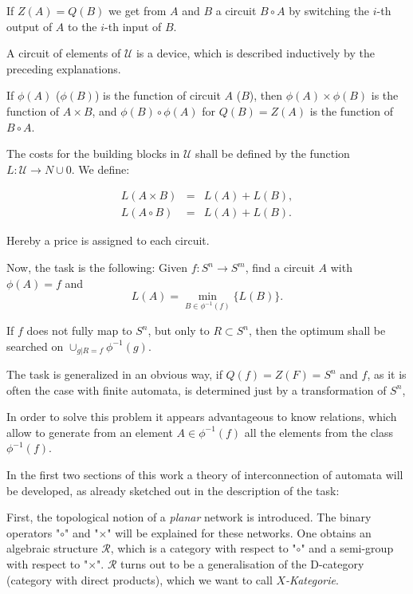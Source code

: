 \documentclass{article}
\begin{document}
If $Z(A) = Q(B)$ we get from $A$ and $B$ a circuit $B\circ A$ by switching the $i$-th output of $A$ to the $i$-th input of $B$.

A circuit of elements of $\mathcal{U}$ is a device, which is described inductively by the preceding explanations.

If $\phi(A)$ ($\phi(B)$) is the function of circuit $A$ ($B$), then $\phi(A)\times \phi(B)$ is the function of $A\times B$, and $\phi(B)\circ \phi(A)$ for $Q(B) = Z(A)$  is the function of $B\circ A$.

The costs for the building blocks in $\mathcal{U}$ shall be defined by the function $L : \mathcal{U} \rightarrow N \cup {0}$. We define:

\[
\begin{array}{lcr}
L(A\times B) & = & L(A) + L(B), \\
L(A\circ B) & = & L(A) + L(B).
\end{array}
\]

Hereby a price is assigned to each circuit.

Now, the task is the following: Given $f : S^n \rightarrow S^m$, find a circuit $A$ with $\phi(A) = f$ and
\[
L(A) = \min_{B \in \phi^{-1}(f)} \{ L(B) \}.
\]

If $f$ does not fully map to $S^n$, but only to $R \subset S^n$, then the optimum shall be searched on $\cup_{g|R=f} \phi^{-1}(g)$. 

The task is generalized in an obvious way, if $Q(f) = Z(F) = S^n$ and $f$, as it is often the case with finite automata, is determined just by a transformation of $S^n$, 

In order to solve this problem it appears advantageous to know relations, which allow to generate from an element $A \in \phi^{-1}(f)$ all the elements from the class $\phi^{-1}(f)$.

In the first two sections of this work a theory of interconnection of automata will be developed, as already sketched out in the description of the task:

First, the topological notion of a \emph{planar} network is introduced. The binary operators "$\circ$" and "$\times$" will be explained for these networks. One obtains an algebraic structure $\mathcal{R}$, which is a category with respect to "$\circ$" and a semi-group with respect to "$\times$". $\mathcal{R}$ turns out to be a generalisation of the D-category (category with direct products), which we want to call \emph{$X$-Kategorie}.
\end{document}
